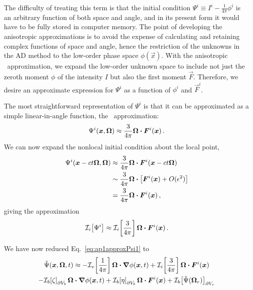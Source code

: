 The difficulty of treating this term is that the initial condition $\Psi^i
\equiv I^i - \frac{1}{4\pi}\phi^i$ is an arbitrary function of both space and
angle, and in its present form it would have to be fully stored in computer
memory.  The point of developing the anisotropic approximations is to avoid the
expense of calculating and retaining complex functions of space and angle, hence
the restriction of the unknowns in the AD method to the low-order phase space
$\phi(\vec{x})$. With the anisotropic \Pone\ approximation, we expand the
low-order unknown space to include not just the zeroth moment $\phi$ of the intensity
$I$ but also the first moment $\vec{F}$.  Therefore, we desire an approximate
expression for $\Psi^i$ as a function of $\phi^i$ and $\vec{F}^i$.

The most straightforward representation of $\Psi^i$ is that it can be approximated
as a simple linear-in-angle function, the \Pone\ approximation:
\begin{equation*}
  \Psi^i(\bm{x},\bm{\Omega})
  \approx \frac{3}{4\pi} \bm{\Omega} \bm{\cdot} \bm{F}^i(\bm{x}) \,.
\end{equation*}
We can now expand the nonlocal initial condition about the local point,
\begin{align*}
  \Psi^i( \bm{x} - ct \bm{\Omega}, \bm{\Omega})
  & \approx  \frac{3}{4\pi} \bm{\Omega} \bm{\cdot} \bm{F}^i( \bm{x} - ct \bm{\Omega})
  \\
  &\sim \frac{3}{4\pi} \bm{\Omega} \bm{\cdot} \left[ 
  \bm{F}^i( \bm{x} ) + O(\epsilon^2) \right]
  \\
  &= \frac{3}{4\pi} \bm{\Omega} \bm{\cdot} \bm{F}^i( \bm{x} ) \,,
\end{align*}
giving the approximation
\begin{equation*}
  \mathcal{I}_{i}\!\left[\Psi^i\right] \approx \mathcal{I}_{i}\!\left[\frac{3}{4\pi}\right] \bm{\Omega} \bm{\cdot}
  \bm{F}^i( \bm{x} ) \,.
\end{equation*}

We have now reduced Eq.~\eqref{eq:ap1approxPsi1} to
\begin{multline} \label{eq:ap1approxPsi2}
  \tilde\Psi(\bm{x},\bm{\Omega},t)
  \approx 
  - \mathcal{I}_{v}\!\left[\frac{1}{4\pi}\right] \bm{\Omega}\bm{\cdot} \bm{\nabla} \phi(\bm{x},t)
  + \mathcal{I}_{i}\!\left[\frac{3}{4\pi}\right] \bm{\Omega} \bm{\cdot} \bm{F}^i( \bm{x} )
  \\
  - \mathcal{I}_{b}\!\left[\zeta\right]_{\partial V_b} \bm{\Omega}\bm{\cdot} \bm{\nabla} \phi(\bm{x},t)
  + \mathcal{I}_{b}\!\left[\eta\right]_{\partial V_b} \bm{\Omega}\bm{\cdot} \bm{F}^i(\bm{x})
  + \mathcal{I}_{b}\!\left[\tilde\Psi(\bm{\Omega}_r)\right]_{\partial V_r}
\end{multline}

